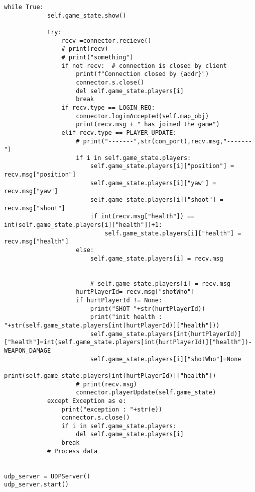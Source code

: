 \begin{lstlisting}[style=pythonstyle, caption=server code UDP]
        while True:
            self.game_state.show()

            try:
                recv =connector.recieve()
                # print(recv)
                # print("something")
                if not recv:  # connection is closed by client
                    print(f"Connection closed by {addr}")
                    connector.s.close()
                    del self.game_state.players[i]
                    break
                if recv.type == LOGIN_REQ:
                    connector.loginAccepted(self.map_obj)
                    print(recv.msg + " has joined the game")
                elif recv.type == PLAYER_UPDATE:
                    # print("-------",str(com_port),recv.msg,"-------")
                    if i in self.game_state.players:
                        self.game_state.players[i]["position"] = recv.msg["position"]
                        self.game_state.players[i]["yaw"] = recv.msg["yaw"]
                        self.game_state.players[i]["shoot"] = recv.msg["shoot"]
                        if int(recv.msg["health"]) == int(self.game_state.players[i]["health"])+1:
                            self.game_state.players[i]["health"] = recv.msg["health"]
                    else:
                        self.game_state.players[i] = recv.msg

                            
                        # self.game_state.players[i] = recv.msg
                    hurtPlayerId= recv.msg["shotWho"]
                    if hurtPlayerId != None:
                        print("SHOT "+str(hurtPlayerId))
                        print("init health : "+str(self.game_state.players[int(hurtPlayerId)]["health"]))
                        self.game_state.players[int(hurtPlayerId)]["health"]=int(self.game_state.players[int(hurtPlayerId)]["health"])-WEAPON_DAMAGE
                        self.game_state.players[i]["shotWho"]=None
                        print(self.game_state.players[int(hurtPlayerId)]["health"])
                    # print(recv.msg)
                    connector.playerUpdate(self.game_state)
            except Exception as e:
                print("exception : "+str(e))
                connector.s.close()
                if i in self.game_state.players:
                    del self.game_state.players[i]
                break
            # Process data


udp_server = UDPServer()
udp_server.start()




        \end{lstlisting}

